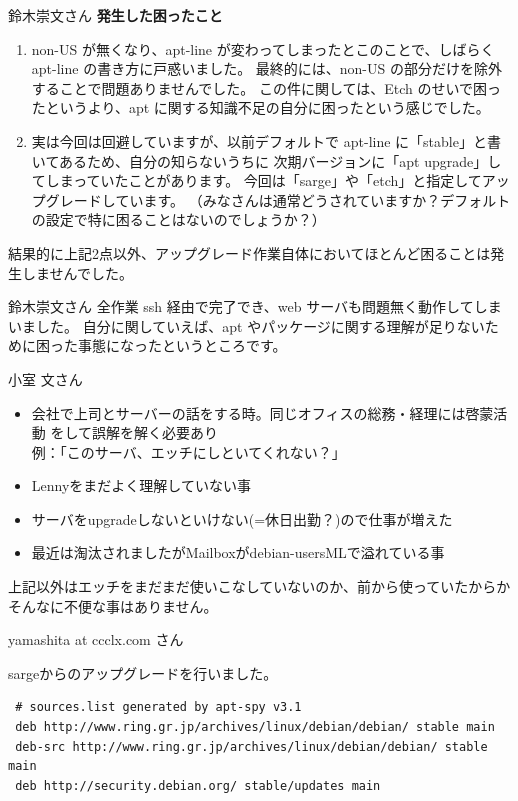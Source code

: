 \documentclass[cjk,dvipdfmx,12pt]{beamer}
\begin{document}
\begin{frame}{鈴木崇文さん}
\textbf{発生した困ったこと}

\begin{enumerate}
 \item	 non-US が無くなり、apt-line が変わってしまったとこのことで、しばらく apt-line の書き方に戸惑いました。
	最終的には、non-US の部分だけを除外することで問題ありませんでした。
	この件に関しては、Etch のせいで困ったというより、apt に関する知識不足の自分に困ったという感じでした。
 \item	 実は今回は回避していますが、以前デフォルトで apt-line に「stable」と書いてあるため、自分の知らないうちに
	次期バージョンに「apt upgrade」してしまっていたことがあります。
	今回は「sarge」や「etch」と指定してアップグレードしています。
	（みなさんは通常どうされていますか？デフォルトの設定で特に困ることはないのでしょうか？）
\end{enumerate}

結果的に上記2点以外、アップグレード作業自体においてほとんど困ることは発生しませんでした。
\end{frame}\begin{frame}{鈴木崇文さん}
全作業 ssh 経由で完了でき、web サーバも問題無く動作してしまいました。
自分に関していえば、apt やパッケージに関する理解が足りないために困った事態になったというところです。

\end{frame}\begin{frame}{小室 文さん}

\begin{itemize}
 \item 会社で上司とサーバーの話をする時。同じオフィスの総務・経理には啓蒙活動
をして誤解を解く必要あり\\
 例：「このサーバ、エッチにしといてくれない？」
 \item Lennyをまだよく理解していない事
 \item サーバをupgradeしないといけない(=休日出勤？)ので仕事が増えた
 \item 最近は淘汰されましたがMailboxがdebian-usersMLで溢れている事
\end{itemize}
上記以外はエッチをまだまだ使いこなしていないのか、前から使っていたからか
そんなに不便な事はありません。

\end{frame}\begin{frame}[containsverbatim]{yamashita at ccclx.com さん}

sargeからのアップグレードを行いました。

\begin{verbatim}
 # sources.list generated by apt-spy v3.1
 deb http://www.ring.gr.jp/archives/linux/debian/debian/ stable main
 deb-src http://www.ring.gr.jp/archives/linux/debian/debian/ stable main
 deb http://security.debian.org/ stable/updates main


\end{verbatim}
\end{frame}
\end{document}
